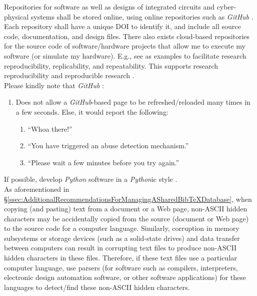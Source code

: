 \documentclass[letter,12pt]{article}
\begin{document}
Repositories for software as well as designs of integrated circuits and cyber-physical systems shall be stored online, using online repositories such as {\it GitHub} \cite{GitHubStaff2016}. Each repository shall have a unique DOI to identify it, and include all source code, documentation, and design files. There also exists cloud-based repositories for the source code of software/hardware projects that allow me to execute my software (or simulate my hardware). E.g., see \cite{CodeOceanstaff2017,RunMyCodeAssociationContributors2013} as examples to facilitate research reproducibility, replicability, and repeatability. This supports research reproducibility and reproducible research \cite{Schiermeier2018,Baumer2017,CodeOceanstaff2017,DatopianAtomaticLtdIncStaff2017,Kim2017,Mailund2017,Barba2016,Gandrud2015,Liberman2015,Creswell2014,Gandrud2014,Stodden2014,RunMyCodeAssociationContributors2013,Blackburn20XY,Geier20XY,Krishnamurthi20XY}. \\

Please kindly note that {\it GitHub} \cite{GitHubStaff2016}: \vspace{-0.3cm}
\begin{enumerate} \itemsep -4pt
\item Does not allow a {\it GitHub}-based page to be refreshed/reloaded many times in a few seconds. Else, it would report the following: \vspace{-0.3cm}
	\begin{enumerate} \itemsep -2pt
	\item ``Whoa there!''
	\item ``You have triggered an abuse detection mechanism.''
	\item ``Please wait a few minutes before you try again.''
	\end{enumerate}
\end{enumerate}



If possible, develop {\it Python} software in a {\it Python}ic style \cite[Chapter 1, pp. 1--12,12--17]{Alchin2010} \cite{Jon2014,Reitz2016a,Reitz2016,Preshing2014,Franca2014,vanRossum2013}. \\



As aforementioned in \S\ref{ssec:AdditionalRecommendationsForManagingASharedBibTeXDatabase}, when copying (and pasting) text from a document or a Web page, non-ASCII hidden characters may be accidentally copied from the source (document or Web page) to the source code for a computer language. Similarly, corruption in memory subsystems or storage devices (such as a solid-state drives) and data transfer between computers can result in corrupting text files to produce non-ASCII hidden characters in these files. Therefore, if these text files use a particular computer language, use parsers (for software such as compilers, interpreters, electronic design automation software, or other software applications) for these languages to detect/find these non-ASCII hidden characters. \\
\end{document}
